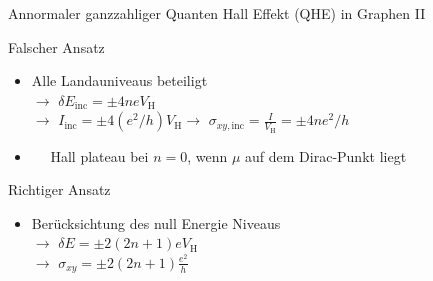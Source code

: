 \documentclass[../defence.tex]{subfiles}
\begin{document}
  \begin{frame}{Annormaler ganzzahliger Quanten Hall Effekt (QHE) in Graphen II}
        \begin{alertblock}{Falscher Ansatz}
          \begin{itemize}
            \item Alle Landauniveaus beteiligt\\
            \pause
            $\rightarrow$ $\delta E_\mathrm{inc}=\pm 4neV_\mathrm{H}$\\
            $\rightarrow$ $I_\mathrm{inc}=\pm 4(e^2/h)V_\mathrm{H}$\pause $\rightarrow$ $\sigma_ {xy,\mathrm{inc}}=\frac{I}{V_\mathrm{H}}=\pm 4ne^2 / h$
            \pause
            \item \faBolt$\quad$ Hall plateau bei $n=0$, wenn $\mu$ auf dem Dirac-Punkt liegt
          \end{itemize}
        \end{alertblock}
        \pause
        \begin{exampleblock}{Richtiger Ansatz}
          \begin{itemize}
            \item Berücksichtung des null Energie Niveaus\\
            \pause
            $\rightarrow$ $\delta E=\pm 2(2n+1)eV_\mathrm{H}$\\
            $\rightarrow$ $\sigma_{xy}=\pm 2(2n+1)\frac{e^2}{h}$
          \end{itemize}
        \end{exampleblock}
  \end{frame}
\end{document}
